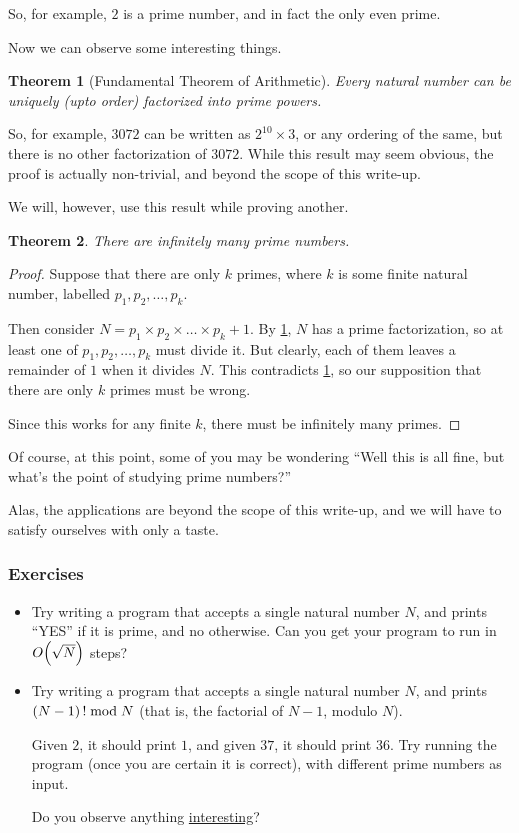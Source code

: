\documentclass{article}
\newtheorem{theorem}{Theorem}
\DeclarePairedDelimiter{\braces}{(}{)}
\begin{document}
So, for example, $2$ is a prime number, and in fact the only even prime.

Now we can observe some interesting things.
\begin{theorem}[Fundamental Theorem of Arithmetic]
	\label{ftarith}
	Every natural number can be uniquely (upto order) factorized
	into prime powers.
\end{theorem}

So, for example, $3072$ can be written as $2^{10} \times 3$, or any ordering
of the same, but there is no other factorization of $3072$.
While this result may seem obvious, the proof is actually non-trivial, and
beyond the scope of this write-up.

We will, however, use this result while proving another.

\begin{theorem}
	\label{infprime}
	There are infinitely many prime numbers.
\end{theorem}

\begin{proof}
	Suppose that there are only $k$ primes, where $k$ is some finite
	natural number, labelled $p_1, p_2, \dots, p_k$.

	Then consider $N = p_1 \times p_2 \times\dots\times p_k + 1$.
	By \ref{ftarith}, $N$ has a prime factorization, so at least one
	of $p_1, p_2, \dots , p_k$ must divide it.
	But clearly, each of them leaves a remainder of $1$ when it divides $N$.
	This contradicts \ref{ftarith}, so our supposition that there are only $k$
	primes must be wrong.

	Since this works for any finite $k$, there must be infinitely many primes.
\end{proof}

Of course, at this point, some of you may be wondering
``Well this is all fine, but what's the point of studying prime numbers?''

Alas, the applications are beyond the scope of this write-up, and we will have to satisfy
ourselves with only a taste.

\subsubsection{Exercises}
\begin{itemize}
	\item
		Try writing a program that accepts a single natural number $N$, and prints ``YES'' if it
		is prime, and no otherwise.
		Can you get your program to run in $O\braces*{\sqrt{N}}$ steps?
	\item
		Try writing a program that accepts a single natural number $N$, and prints
		$\braces*{N - 1}\,! \bmod N$ (that is, the factorial of $N - 1$, modulo $N$).

		Given $2$, it should print $1$, and given $37$, it should print $36$.
		Try running the program (once you are certain it is correct), with different prime
		numbers as input.

		Do you observe anything 
		\href{https://en.wikipedia.org/wiki/Wilson%27s_theorem}{interesting}?
\end{itemize}
\end{document}
